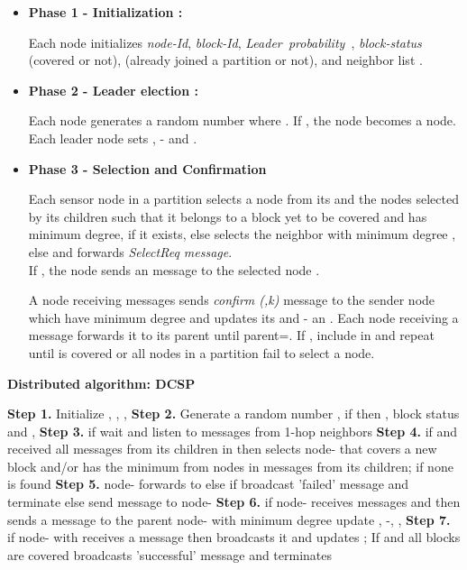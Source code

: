 \documentclass{acm_proc_article-sp}
\begin{document}
 \begin{itemize}
 \vspace{-0.4cm}
 \item {\bf Phase 1 - Initialization :}
 
           Each node  initializes {\it node-Id}, {\it block-Id}, {\it Leader~probability~}, {\it block-status }(covered or not),  (already joined a partition or not),  and neighbor list .
\item{\bf Phase 2 - Leader election :} 
    
      Each node  generates a random number  where . If , the node  becomes a  node. Each leader node  sets , - and .
\item{\bf Phase 3 - Selection and Confirmation }

	 Each sensor node  in a partition  selects a node  from its  and the nodes selected by its children such that it belongs to a block yet to be covered and has minimum degree, if it exists, else selects the neighbor with minimum degree , else  and forwards {\it SelectReq message}.\\   
	If  , the node sends an  message to the selected node .
        
A node  receiving  messages sends {\it confirm (,k)} message to the sender node which have minimum degree  and updates its  and - an
. Each node receiving a  message forwards it to its parent until parent=. If , include  in  and repeat until  is covered or all nodes in a partition fail to select a node.
\end{itemize}
 { \bf Distributed algorithm: DCSP}
 \begin{algorithm}[!h]
  \scriptsize
  \SetLine
\caption{\scriptsize{ Distributed algorithm: DCSP}}
{
    {\bf Step 1.} Initialize , , , \;
    {\bf Step 2.} Generate a random number , if  then , block status and , \; 
    {\bf Step 3.} if  wait and listen to messages from 1-hop neighbors\;
    {\bf Step 4.} if  and received all  messages from its children in  then selects node- that covers a new block and/or has the minimum  from  nodes in  messages from its children; if none is found \;
    {\bf Step 5.} node- forwards  to  else if  broadcast 'failed' message and terminate else send  message to node- \;
    {\bf Step 6.} if node- receives  messages and  then sends a  message to the parent node- with minimum degree \; update , -, , \;
    {\bf Step 7.} if node- with  receives a  message then broadcasts it and updates ; If  and all blocks are covered broadcasts 'successful' message and terminates \;
 }
 \normalsize
 \end{algorithm}
\vspace{-0.5cm}
\end{document}
